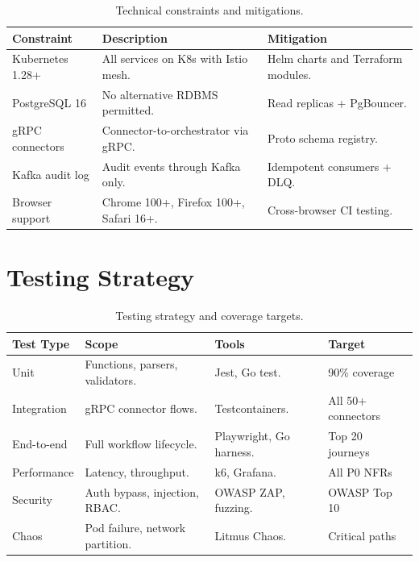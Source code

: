 \documentclass[
    language=english,
    doctype=article,
    institution=none,
]{../../omnilatex}
\begin{document}
\begin{table}[htbp]
\centering\small
\begin{tabular}{@{}lp{4.2cm}p{3.8cm}@{}}
    \toprule
    \textbf{Constraint} & \textbf{Description} & \textbf{Mitigation} \\
    \midrule
    Kubernetes 1.28+     & All services on K8s with Istio mesh. &
        Helm charts and Terraform modules. \\
    PostgreSQL 16         & No alternative RDBMS permitted. &
        Read replicas + PgBouncer. \\
    gRPC connectors      & Connector-to-orchestrator via gRPC. &
        Proto schema registry. \\
    Kafka audit log      & Audit events through Kafka only. &
        Idempotent consumers + DLQ. \\
    Browser support      & Chrome 100+, Firefox 100+, Safari 16+. &
        Cross-browser CI testing. \\
    \bottomrule
\end{tabular}
\caption{Technical constraints and mitigations.}
\label{tab:constraints}
\end{table}

\section{Testing Strategy}

\begin{table}[htbp]
\centering\small
\begin{tabular}{@{}lp{3cm}p{3.5cm}l@{}}
    \toprule
    \textbf{Test Type} & \textbf{Scope} & \textbf{Tools}
        & \textbf{Target} \\
    \midrule
    Unit         & Functions, parsers, validators. &
        Jest, Go test. & 90\% coverage \\
    Integration  & gRPC connector flows. &
        Testcontainers. & All 50+ connectors \\
    End-to-end   & Full workflow lifecycle. &
        Playwright, Go harness. & Top 20 journeys \\
    Performance  & Latency, throughput. &
        k6, Grafana. & All P0 NFRs \\
    Security     & Auth bypass, injection, RBAC. &
        OWASP ZAP, fuzzing. & OWASP Top 10 \\
    Chaos        & Pod failure, network partition. &
        Litmus Chaos. & Critical paths \\
    \bottomrule
\end{tabular}
\caption{Testing strategy and coverage targets.}
\label{tab:test-plan}
\end{table}
\end{document}
